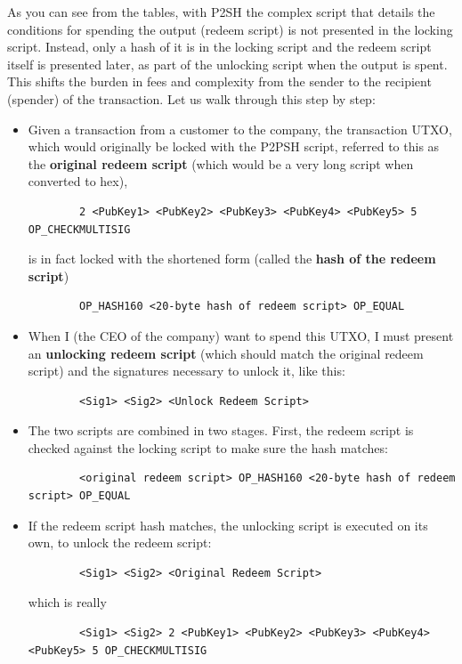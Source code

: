 \documentclass{article}
\begin{document}
    As you can see from the tables, with P2SH the complex script that details the conditions for spending the output (redeem script) is not presented in the locking script. Instead, only a hash of it is in the locking script and the redeem script itself is presented later, as part of the unlocking script when the output is spent. This shifts the burden in fees and complexity from the sender to the recipient (spender) of the transaction. Let us walk through this step by step:

    \begin{itemize}
      \item Given a transaction from a customer to the company, the transaction UTXO, which would originally be locked with the P2PSH script, referred to this as the \textbf{original redeem script} (which would be a very long script when converted to hex),
        \begin{lstlisting}
        2 <PubKey1> <PubKey2> <PubKey3> <PubKey4> <PubKey5> 5 OP_CHECKMULTISIG
        \end{lstlisting}
        is in fact locked with the shortened form (called the \textbf{hash of the redeem script})
        \begin{lstlisting}
        OP_HASH160 <20-byte hash of redeem script> OP_EQUAL
        \end{lstlisting}
      \item When I (the CEO of the company) want to spend this UTXO, I must present an \textbf{unlocking redeem script} (which should match the original redeem script) and the signatures necessary to unlock it, like this:
        \begin{lstlisting}
        <Sig1> <Sig2> <Unlock Redeem Script>
        \end{lstlisting}
      \item The two scripts are combined in two stages. First, the redeem script is checked against the locking script to make sure the hash matches:
        \begin{lstlisting}
        <original redeem script> OP_HASH160 <20-byte hash of redeem script> OP_EQUAL
        \end{lstlisting}
      \item If the redeem script hash matches, the unlocking script is executed on its own, to unlock the redeem script:
        \begin{lstlisting}
        <Sig1> <Sig2> <Original Redeem Script>
        \end{lstlisting}
        which is really
        \begin{lstlisting}
        <Sig1> <Sig2> 2 <PubKey1> <PubKey2> <PubKey3> <PubKey4> <PubKey5> 5 OP_CHECKMULTISIG
        \end{lstlisting}
    \end{itemize}
\end{document}
